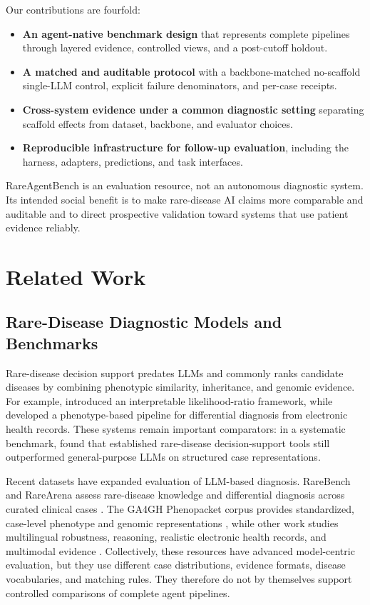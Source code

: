 \documentclass[letterpaper]{article} %
\begin{document}
Our contributions are fourfold:
\begin{itemize}
  \item \textbf{An agent-native benchmark design} that represents complete
  pipelines through layered evidence, controlled views, and a post-cutoff
  holdout.
  \item \textbf{A matched and auditable protocol} with a backbone-matched
no-scaffold single-LLM control, explicit failure denominators, and per-case
receipts.
  \item \textbf{Cross-system evidence under a common diagnostic setting}
  separating scaffold effects from dataset, backbone, and evaluator choices.
  \item \textbf{Reproducible infrastructure for follow-up evaluation},
  including the harness, adapters, predictions, and task interfaces.
\end{itemize}

RareAgentBench is an evaluation resource, not an autonomous diagnostic
system. Its intended social benefit is to make rare-disease AI claims more
comparable and auditable and to direct prospective validation toward systems
that use patient evidence reliably.
\section{Related Work}
\label{sec:related-work}

\subsection{Rare-Disease Diagnostic Models and Benchmarks}

Rare-disease decision support predates LLMs and commonly ranks candidate
diseases by combining phenotypic similarity, inheritance, and genomic
evidence. For example, \citet{robinson2020lirical} introduced an interpretable
likelihood-ratio framework, while \citet{mao2025phenobrain} developed a
phenotype-based pipeline for differential diagnosis from electronic health
records. These systems remain important comparators: in a systematic
benchmark, \citet{reese2026systematic} found that established rare-disease
decision-support tools still outperformed general-purpose LLMs on structured
case representations.

Recent datasets have expanded evaluation of LLM-based diagnosis.
RareBench and RareArena assess rare-disease knowledge and differential
diagnosis across curated clinical cases
\citep{chen2024rarebench,chen2026rarearena}. The GA4GH Phenopacket corpus
provides standardized, case-level phenotype and genomic representations
\citep{danis2025phenopackets}, while other work studies multilingual
robustness, reasoning, realistic electronic health records, and multimodal
evidence
\citep{chimirri2025consistent,qiu2025medrbench,eizaldin2026mimicrd,
ning2026mmrarebench}. Collectively, these resources have advanced
model-centric evaluation, but they use different case distributions, evidence
formats, disease vocabularies, and matching rules. They therefore do not by
themselves support controlled comparisons of complete agent pipelines.
\end{document}
